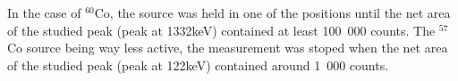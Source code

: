 \documentclass[11pt,a4paper]{article}
\begin{document}
In the case of $^{60}$Co, the source was held in one of the positions until the net area of the studied peak (peak at 1332keV) contained at least 100~000 counts. The $^{57}$Co source being way less active, the measurement was stoped when the net area of the studied peak (peak at 122keV) contained around 1~000 counts.
\end{document}
